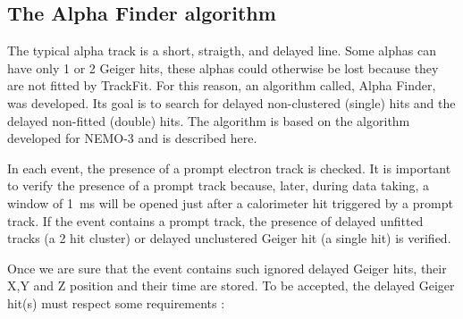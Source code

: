 \documentclass[main.tex]{subfiles}
\begin{document}
\subsection{The Alpha Finder algorithm}
\noindent The typical alpha track is a short, straigth, and delayed line. Some alphas can have only 1 or 2 Geiger hits, these alphas could otherwise be lost because they are not fitted by TrackFit. For this reason, an algorithm called, Alpha Finder, was developed. Its goal is to search for delayed non-clustered (single) hits and the delayed non-fitted (double) hits. The algorithm is based on the algorithm developed for NEMO-3 and is described here. %


\bigskip


\noindent In each event, the presence of a prompt electron track is checked. It is important to verify the presence of a prompt track because, later, during data taking, a window of 1~ms will be opened just after a calorimeter hit triggered by a prompt track. If the event contains a prompt track, the presence of delayed unfitted tracks (a 2 hit cluster) or delayed unclustered Geiger hit (a single hit) is verified.


\bigskip


\noindent Once we are sure that the event contains such ignored delayed Geiger hits, their X,Y and Z position and their time are stored. To be accepted, the delayed Geiger hit(s) must respect some requirements :
\end{document}
